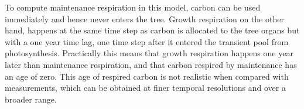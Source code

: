\documentclass[12pt, a4paper]{article}
\begin{document}
To compute maintenance respiration in this model, carbon can be used immediately and hence never enters the tree. Growth respiration on the other hand, happens at the same time step as carbon is allocated to the tree organs but with a one year time lag, one time step after it entered the transient pool from photosynthesis.
Practically this means that growth respiration happens one year later than maintenance respiration, and that carbon respired by maintenance has an age of zero. 
This age of respired carbon is not realistic when compared with measurements, which can be obtained at finer temporal resolutions and over a broader range. 



\end{document}
